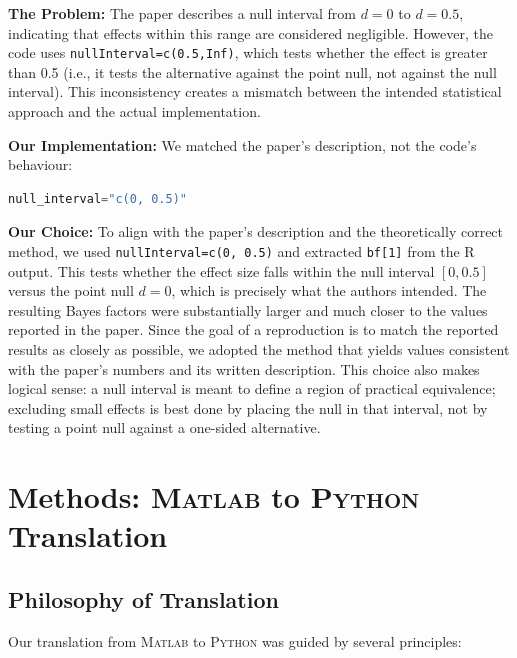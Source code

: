 \documentclass[11pt,a4paper]{article}
\newcommand{\matlab}{\textsc{Matlab}}
\newcommand{\python}{\textsc{Python}}
\begin{document}
\textbf{The Problem:}
The paper describes a null interval from $d=0$ to $d=0.5$, indicating that effects within this range are considered negligible. However, the code uses \texttt{nullInterval=c(0.5,Inf)}, which tests whether the effect is greater than 0.5 (i.e., it tests the alternative against the point null, not against the null interval). This inconsistency creates a mismatch between the intended statistical approach and the actual implementation.

\textbf{Our Implementation:}
We matched the paper's description, not the code's behaviour:
\begin{lstlisting}[style=pythonstyle,language=Python]
null_interval="c(0, 0.5)"
\end{lstlisting}

\textbf{Our Choice:}
To align with the paper's description and the theoretically correct method, we used \texttt{nullInterval=c(0, 0.5)} and extracted \texttt{bf[1]} from the R output. This tests whether the effect size falls within the null interval $[0, 0.5]$ versus the point null $d=0$, which is precisely what the authors intended. The resulting Bayes factors were substantially larger and much closer to the values reported in the paper. Since the goal of a reproduction is to match the reported results as closely as possible, we adopted the method that yields values consistent with the paper's numbers and its written description. This choice also makes logical sense: a null interval is meant to define a region of practical equivalence; excluding small effects is best done by placing the null in that interval, not by testing a point null against a one-sided alternative.


\section{Methods: \matlab{} to \python{} Translation}
\label{sec:methods}

\subsection{Philosophy of Translation}
\label{subsec:philosophy}

Our translation from \matlab{} to \python{} was guided by several principles:
\end{document}
